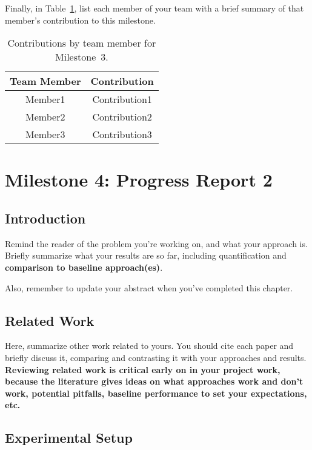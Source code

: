 \documentclass{report}
\begin{document}
Finally, in Table~\ref{tab:contribution3}, list each member of your team with a brief summary of that member's contribution to this milestone.

\begin{table}[]
    \caption{Contributions by team member for Milestone~3.}
    \centering
    \begin{tabular}{|c|c|} \hline
    {\bf Team Member}     &  {\bf Contribution}  \\ \hline
    Member1     &  Contribution1 \\
    Member2     &  Contribution2 \\
    Member3     &  Contribution3 \\ \hline
    \end{tabular}
    \label{tab:contribution3}
\end{table}


\chapter{Milestone 4: Progress Report 2}


\section{Introduction}
\label{sec:M4-intro}

Remind the reader of the problem you're working on, and what your approach is.  Briefly summarize what your results are so far, including quantification and {\bf comparison to  baseline approach(es)}.

Also, remember to update your abstract when you've completed this chapter.

\section{Related Work}

Here, summarize other work related to yours.  You should cite each paper and briefly discuss it, comparing and contrasting it with your approaches and results. 
 {\bf Reviewing related work is critical early on in your project work, because the literature gives ideas on what approaches work and don't work, potential pitfalls, baseline performance to set your expectations, etc.}

\section{Experimental Setup}
\label{sec:M3-setup}
\end{document}
